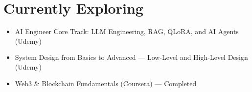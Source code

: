 \documentclass[10pt]{article}
\begin{document}
\section*{Currently Exploring}
\vspace{2pt}
\begin{itemize}[leftmargin=*, itemsep=2pt]
\item AI Engineer Core Track: LLM Engineering, RAG, QLoRA, and AI Agents (Udemy)
\item System Design from Basics to Advanced — Low-Level and High-Level Design (Udemy)
\item Web3 \& Blockchain Fundamentals (Coursera) — Completed
\end{itemize}
\end{document}
